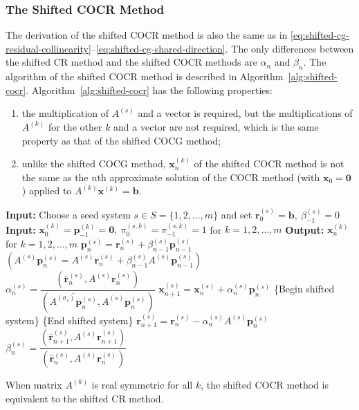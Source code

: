 \subsubsection{{The Shifted COCR Method}}\label{subsec:shifted-cocr}
{The derivation of the shifted COCR method  is also the same as in \eqref{eq:shifted-cg-residual-collinearity}--\eqref{eq:shifted-cg-shared-direction}. The only differences between the shifted CR method and the shifted COCR methods are $\alpha_n$ and $\beta_n$. The algorithm of the shifted COCR method is described in Algorithm\ \ref{alg:shifted-cocr}.}
{Algorithm\ \ref{alg:shifted-cocr} has the following properties:}
\begin{enumerate}
\item {the multiplication of $A^{(s)}$ and a vector is required, but the multiplications of $A^{(k)}$ for the other $k$ and a vector are not required, which is the same property as that of the shifted COCG method;}
\item {unlike the shifted COCG method, $\bm x_n^{(k)}$ of the shifted COCR method is not the same as the $n$th approximate solution of the COCR method (with $\bm x_0=\bm0$) applied to $A^{(k)}\bm x^{(k)}=\bm b$.}
\end{enumerate}
\begin{algorithm}[H]\caption{{The shifted COCR method (note: $(\bar{\bm a},\bm b)=\bm a^{\top}\bm b$)}}\label{alg:shifted-cocr}\begin{algorithmic}[1]
\Statex\textbf{Input:} {Choose a seed system $s\in S=\{1,2,\ldots,m\}$ and set $\bm r_0^{(s)}=\bm b,\ \beta_{-1}^{(s)}=0$}
\Statex\textbf{Input:} $\bm x_0^{(k)}=\bm p_{-1}^{(k)}=\bm0,\ \pi_0^{(s,k)}=\pi_{-1}^{(s,k)}=1$ {for} $k=1,2,\ldots,m$
\Statex\textbf{Output:} $\bm x_n^{(k)}$ {for} $k=1,2,\ldots,m$
\State $\bm p_n^{(s)}=\bm r_n^{(s)}+\beta_{n-1}^{(s)}\bm p_{n-1}^{(s)}$
\State $(A^{(s)}\bm p_n^{(s)}=A^{(s)}\bm r_n^{(s)}+\beta_{n-1}^{(s)}A^{(s)}\bm p_{n-1}^{(s)})$
\State $\alpha_n^{(s)}=\dfrac{(\bar{\bm r}_n^{(s)},A^{(s)}\bm r_n^{(s)})}{(\overline{A^{(\sigma_s)}\bm p_n^{(s)}},A^{(s)}\bm p_n^{(s)})}$
\State $\bm x_{n+1}^{(s)}=\bm x_n^{(s)}+\alpha_n^{(s)}\bm p_n^{(s)}$
\State \{{Begin shifted system}\}
\State \{{End shifted system}\}
\State $\bm r_{n+1}^{(s)}=\bm r_n^{(s)}-\alpha_n^{(s)}A^{(s)}\bm p_n^{(s)}$
\State $\beta_n^{(s)}=\dfrac{(\bar{\bm r}_{n+1}^{(s)},A^{(s)}\bm r_{n+1}^{(s)})}{(\bar{\bm r}_n^{(s)},A^{(s)}\bm r_n^{(s)})}$
\EndFor\end{algorithmic}\end{algorithm}
{When matrix $A^{(k)}$ is real symmetric for all $k$, the shifted COCR method is equivalent to the shifted CR method.}
